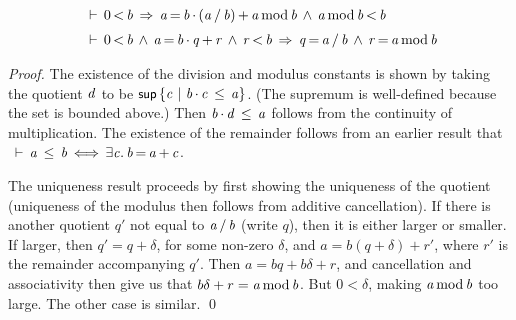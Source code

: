 \documentclass[11pt]{llncs}
\renewcommand{\HOLConst}[1]{{\textsf{\upshape\small #1}}}
\renewcommand{\HOLinline}[1]{\ensuremath{#1}}
\newcommand{\holthmenv}[1]{\begin{array}[t]{l}#1\end{array}}
\begin{document}
\begin{theorem}
\[
\begin{array}{l}
\holthmenv{\HOLTokenTurnstile{}\,0\,\ensuremath{{<}}\,\HOLFreeVar{b}\,\HOLTokenImp{}\,\HOLFreeVar{a}\,{\ensuremath{=}}\,\HOLFreeVar{b}\,\ensuremath{{\cdot}}\,(\HOLFreeVar{a}\,/\,\HOLFreeVar{b})\,\ensuremath{{+}}\,\HOLFreeVar{a}\,\textrm{\upshape mod}\,\HOLFreeVar{b}\,\HOLTokenConj{}\,\HOLFreeVar{a}\,\textrm{\upshape mod}\,\HOLFreeVar{b}\,\ensuremath{{<}}\,\HOLFreeVar{b}} \\[2mm]
\holthmenv{\HOLTokenTurnstile{}\,0\,\ensuremath{{<}}\,\HOLFreeVar{b}\,\HOLTokenConj{}\,\HOLFreeVar{a}\,{\ensuremath{=}}\,\HOLFreeVar{b}\,\ensuremath{{\cdot}}\,\HOLFreeVar{q}\,\ensuremath{{+}}\,\HOLFreeVar{r}\,\HOLTokenConj{}\,\HOLFreeVar{r}\,\ensuremath{{<}}\,\HOLFreeVar{b}\,\HOLTokenImp{}\,\HOLFreeVar{q}\,{\ensuremath{=}}\,\HOLFreeVar{a}\,/\,\HOLFreeVar{b}\,\HOLTokenConj{}\,\HOLFreeVar{r}\,{\ensuremath{=}}\,\HOLFreeVar{a}\,\textrm{\upshape mod}\,\HOLFreeVar{b}}
\end{array}
\]
\end{theorem}

\begin{proof}
The existence of the division and modulus constants is shown by taking the quotient \HOLinline{\HOLFreeVar{d}} to be \HOLinline{\HOLConst{sup}\,\ensuremath{{\{}}\HOLBoundVar{c}\,\ensuremath{{\,\mid\,}}\,\HOLFreeVar{b}\,\ensuremath{{\cdot}}\,\HOLBoundVar{c}\,\HOLTokenLeq{}\,\HOLFreeVar{a}\ensuremath{{\}}}}.
(The supremum is well-defined because the set is bounded above.)
Then \HOLinline{\HOLFreeVar{b}\,\ensuremath{{\cdot}}\,\HOLFreeVar{d}\,\HOLTokenLeq{}\,\HOLFreeVar{a}} follows from the continuity of multiplication.
The existence of the remainder follows from an earlier result that
\HOLinline{\HOLTokenTurnstile{}\,\HOLFreeVar{a}\,\HOLTokenLeq{}\,\HOLFreeVar{b}\,\ensuremath{{\iff}}\,\ensuremath{{\exists}}\HOLBoundVar{c}\ensuremath{.}\,\HOLFreeVar{b}\,{\ensuremath{=}}\,\HOLFreeVar{a}\,\ensuremath{{+}}\,\HOLBoundVar{c}}.

The uniqueness result proceeds by first showing the uniqueness of the quotient (uniqueness of the modulus then follows from additive cancellation).
If there is another quotient $q'$ not equal to \HOLinline{\HOLFreeVar{a}\,/\,\HOLFreeVar{b}} (write $q$), then it is either larger or smaller.
If larger, then $q' = q + \delta$, for some non-zero $\delta$, and $a = b(q + \delta) + r'$, where $r'$ is the remainder accompanying $q'$.
Then $a = bq + b\delta + r$, and cancellation and associativity then give us that $b\delta + r = \HOLinline{\HOLFreeVar{a}\,\textrm{\upshape mod}\,\HOLFreeVar{b}}$.
But $0 < \delta$, making \HOLinline{\HOLFreeVar{a}\,\textrm{\upshape mod}\,\HOLFreeVar{b}} too large.
The other case is similar.
\qed
\end{proof}
\end{document}
